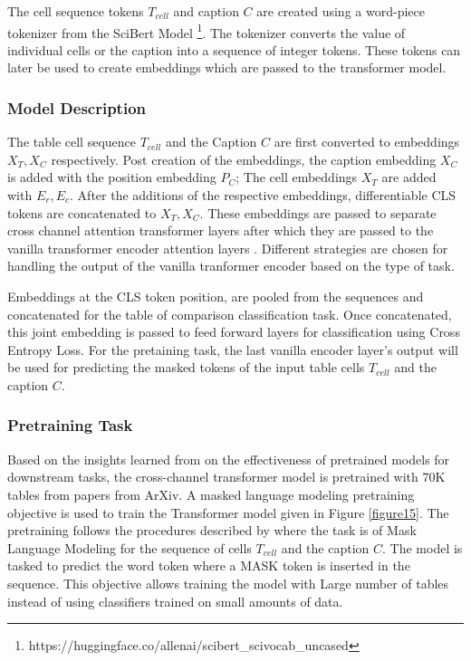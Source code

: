 The cell sequence tokens $T_{cell}$ and caption $C$ are created using a word-piece tokenizer from the SciBert Model \footnote{https://huggingface.co/allenai/scibert\_scivocab\_uncased}. The tokenizer converts the value of individual cells or the caption into a sequence of integer tokens. These tokens can later be used to create embeddings which are passed to the  transformer model. 

\subsubsection{Model Description}
The table cell sequence $T_{cell}$ and the Caption $C$ are first converted to embeddings $X_T, X_C$ respectively. Post creation of the embeddings,  the caption embedding  $X_C$ is added with the position embedding $P_C$; The cell embeddings $X_T$ are added with $E_r,E_c$. After the additions of the respective embeddings, differentiable CLS tokens are concatenated to $X_T,X_C$.
These embeddings are passed to separate cross channel attention transformer layers \parencite{tsai2019multimodal} after which they are passed to the vanilla transformer encoder attention layers \parencite{vaswani2017attention}. Different strategies are chosen for handling the output of the vanilla tranformer encoder based on the type of task. 

Embeddings at the CLS token position, are pooled from the sequences and concatenated for the table of comparison classification task. Once concatenated, this joint embedding is passed to feed forward layers for classification using Cross Entropy Loss. For the pretaining task, the last vanilla encoder layer’s output will be used for predicting the masked tokens of the input table cells $T_{cell}$ and the caption $C$.


\subsubsection{Pretraining Task}
Based on the insights learned from \cite{hernandez2021scaling} on the effectiveness of pretrained models for downstream tasks, the cross-channel transformer model is pretrained with 70K tables from papers from ArXiv. A masked language modeling pretraining objective is used to train the Transformer model given in Figure \ref{figure15}. The pretraining follows the procedures described by \cite{deng2020turl} where the task is of Mask Language Modeling for the sequence of cells $T_{cell}$ and the caption $C$. The model is tasked to predict the word token where a MASK token is inserted in the sequence.  This objective allows training the model with Large number of tables instead of using classifiers trained on small amounts of data. 

